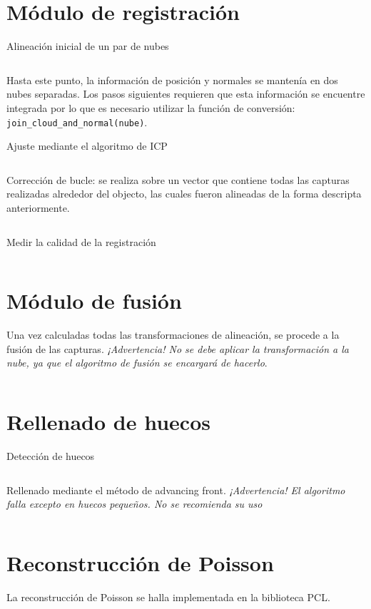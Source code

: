	\section{Módulo de registración}
	Alineación inicial de un par de nubes
	\inputminted{cpp}{code/pairwise_reg.cpp}

	Hasta este punto, la información de posición y normales se mantenía en dos nubes separadas.
	Los pasos siguientes requieren que esta información se encuentre integrada por lo que es necesario utilizar la función de conversión:
	\texttt{join_cloud_and_normal(nube)}.

	Ajuste mediante el algoritmo de ICP
	\inputminted{cpp}{code/pairwise_icp.cpp}

	Corrección de bucle: se realiza sobre un vector que contiene todas las capturas realizadas alrededor del objecto, las cuales fueron alineadas de la forma descripta anteriormente.
	\inputminted{cpp}{code/loop.cpp}

	Medir la calidad de la registración
	\inputminted{cpp}{code/fitness.cpp}

	\section{Módulo de fusión}
	Una vez calculadas todas las transformaciones de alineación, se procede a la fusión de las capturas.
	\emph{¡Advertencia! No se debe aplicar la transformación a la nube, ya que el algoritmo de fusión se encargará de hacerlo}.
	\inputminted{cpp}{code/fusion.cpp}

	\section{Rellenado de huecos}
	Detección de huecos
	\inputminted{cpp}{code/holes.cpp}

	Rellenado mediante el método de advancing front.
	\emph{¡Advertencia! El algoritmo falla excepto en huecos pequeños. No se recomienda su uso}
	\inputminted{cpp}{code/adv_front.cpp}

	\section{Reconstrucción de Poisson}
	La reconstrucción de Poisson se halla implementada en la biblioteca PCL.
	\inputminted{cpp}{code/poisson.cpp}
